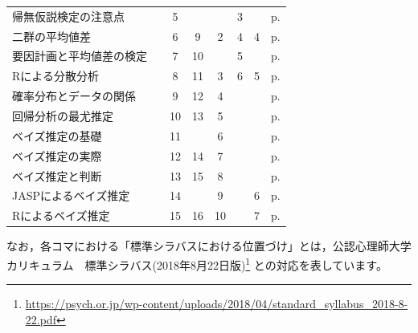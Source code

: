 \documentclass[dvipsnames]{ltjsarticle}
\begin{document}
\begin{table}
\begin{tabular}[t]{lccccccc}
		帰無仮説検定の注意点   &      & 5  &     &       & 3  &    & p.\pageref{s19_NHST2}                \\
		二群の平均値差      &      & 6  & 9   & 2     & 4  & 4  & p.\pageref{s20_ttest}                \\
		要因計画と平均値差の検定 &      & 7  & 10  &       & 5  &    & p.\pageref{s21_anova}                \\
		Rによる分散分析     &      & 8  & 11  & 3     & 6  & 5  & p.\pageref{s22_anova_onR}            \\
		確率分布とデータの関係  &      & 9  & 12  & 4     &    &    & p.\pageref{s23_likelihood}           \\
		回帰分析の最尤推定    &      & 10 & 13  & 5     &    &    & p.\pageref{s24_maximum_likelihood}   \\
		ベイズ推定の基礎     &      & 11 &     & 6     &    &    & p.\pageref{s25_bayesian1}            \\
		ベイズ推定の実際     &      & 12 & 14  & 7     &    &    & p.\pageref{s26_bayesian2}            \\
		ベイズ推定と判断     &      & 13 & 15  & 8     &    &    & p.\pageref{s27_bayesian3}            \\
		JASPによるベイズ推定 &      & 14 &     & 9     &    & 6  & p.\pageref{s28_jasp}                 \\
		Rによるベイズ推定    &      & 15 & 16  & 10    &    & 7  & p.\pageref{s29_brms}                 \\\hline
	\end{tabular}
\end{table}



なお，各コマにおける「標準シラバスにおける位置づけ」とは，公認心理師大学カリキュラム　標準シラバス(2018年8月22日版)\footnote{\url{https://psych.or.jp/wp-content/uploads/2018/04/standard_syllabus_2018-8-22.pdf}} との対応を表しています。


































% 
% 
\printbibliography[title=引用文献]
\end{document}
